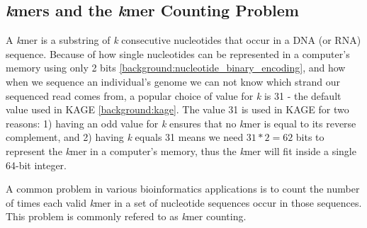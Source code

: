 \subsection{\textit{k}mers and the \textit{k}mer Counting Problem} \label{background:kmers_and_kmer_counting}
A \textit{k}mer is a substring of \textit{k} consecutive nucleotides that occur in a DNA (or RNA) sequence.
Because of how single nucleotides can be represented in a computer's memory using only 2 bits \ref{background:nucleotide_binary_encoding}, and how when we sequence an individual's genome we can not know which strand our sequenced read comes from, a popular choice of value for \textit{k} is 31 - the default value used in KAGE \ref{background:kage}.
The value 31 is used in KAGE for two reasons: 1) having an odd value for \textit{k} ensures that no \textit{k}mer is equal to its reverse complement, and 2) having \textit{k} equals 31 means we need $31*2=62$ bits to represent the \textit{k}mer in a computer's memory, thus the \textit{k}mer will fit inside a single 64-bit integer.

A common problem in various bioinformatics applications is to count the number of times each valid \textit{k}mer in a set of nucleotide sequences occur in those sequences.
This problem is commonly refered to as \textit{k}mer counting.


